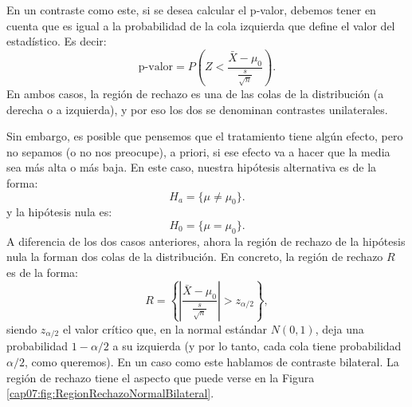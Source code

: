 En un contraste como este, si se desea calcular el p-valor, debemos tener en cuenta que es igual a la probabilidad de la cola {\sf izquierda} que define el valor del estadístico. Es decir:
\begin{equation}\label{cap07:ecu:pValorMediaZColaIzquierda}
\mbox{p-valor}=
P\left(Z < \dfrac{\bar X-\mu_0}{\frac{s}{\sqrt{n}}}\right).
\end{equation}
En ambos casos, la región de rechazo es una de las colas de la distribución (a derecha o a izquierda), y por eso los dos se denominan {\sf contrastes unilaterales}.

Sin embargo, es posible que pensemos que el tratamiento tiene algún efecto, pero no sepamos (o no nos preocupe), a priori, si ese efecto va a hacer que la media sea más alta o más baja. En este caso, nuestra hipótesis alternativa es de la forma:
    \[H_a=\{\mu\neq\mu_0\}.\]
y la hipótesis nula es:
    \[H_0=\{\mu=\mu_0\}.\]
A diferencia de los dos casos anteriores, ahora la región de rechazo de la hipótesis nula la forman dos colas de la distribución. En concreto, la región de rechazo $R$ es de la forma:
    \begin{equation}\label{cap07:ecu:RegionRechazoMediaZBilateral}
        R=\left\{\left|\dfrac{\bar X-\mu_0}{\frac{s}{\sqrt{n}}}\right|>z_{\alpha/2}\right\},
    \end{equation}
siendo $z_{\alpha/2}$ el valor crítico que, en la normal estándar  $N(0,1)$, deja una probabilidad $1-\alpha/2$ a su izquierda (y por lo tanto, cada cola tiene probabilidad $\alpha/2$, como queremos).
En un caso como este hablamos de {\sf contraste bilateral}. La región de rechazo tiene el aspecto que puede verse en la Figura \ref{cap07:fig:RegionRechazoNormalBilateral}.

